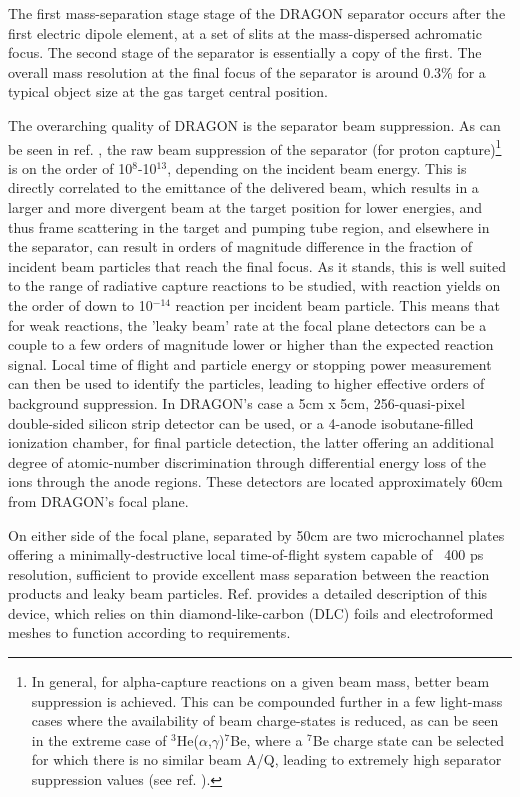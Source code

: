 The first mass-separation stage stage of the DRAGON separator occurs after the first electric dipole element, at a set of slits at the mass-dispersed achromatic focus. The second stage of the separator is essentially a copy of the first. The overall mass resolution at the final focus of the separator is around 0.3\% for a typical object size at the gas target central position.  

The overarching quality of DRAGON is the separator beam suppression. As can be seen in ref. \cite{hutc08}, the raw beam suppression of the separator (for proton capture)\footnote{In general, for alpha-capture reactions on a given beam mass, better beam suppression is achieved. This can be compounded further in a few light-mass cases where the availability of beam charge-states is reduced, as can be seen in the extreme case of $^{3}$He($\alpha$,$\gamma$)$^{7}$Be, where a $^{7}$Be charge state can be selected for which there is no similar beam A/Q, leading to extremely high separator suppression values (see ref. \cite{sju12}).} is on the order of 10$^{8}$-10$^{13}$, depending on the incident beam energy. This is directly correlated to the emittance of the delivered beam, which results in a larger and more divergent beam at the target position for lower energies, and thus frame scattering in the target and pumping tube region, and elsewhere in the separator, can result in orders of magnitude difference in the fraction of incident beam particles that reach the final focus. As it stands, this is well suited to the range of radiative capture reactions to be studied, with reaction yields on the order of down to 10$^{-14}$ reaction per incident beam particle. This means that for weak reactions, the 'leaky beam' rate at the focal plane detectors can be a couple to a few orders of magnitude lower or higher than the expected reaction signal. Local time of flight and particle energy or stopping power measurement can then be used to identify the particles, leading to higher effective orders of background suppression. In DRAGON's case a 5cm x 5cm, 256-quasi-pixel double-sided silicon strip detector can be used, or a 4-anode isobutane-filled ionization chamber, for final particle detection, the latter offering an additional degree of atomic-number discrimination through differential energy loss of the ions through the anode regions. These detectors are located approximately 60cm from DRAGON's focal plane.

On either side of the focal plane, separated by 50cm are two microchannel plates offering a minimally-destructive local time-of-flight system capable of ~400 ps resolution, sufficient to provide excellent mass separation between the reaction products and leaky beam particles. Ref. \cite{vock09} provides a detailed description of this device, which relies on thin diamond-like-carbon (DLC) foils and electroformed meshes to function according to requirements. 

